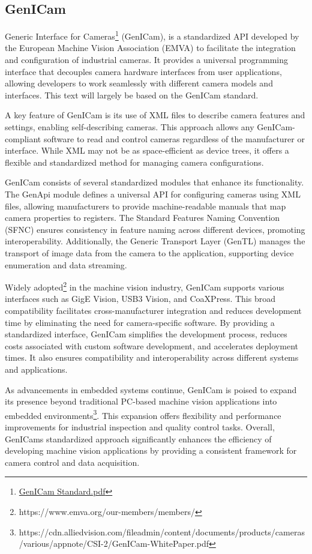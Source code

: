 \subsection {GenICam}
Generic Interface for Cameras\footnote{\href{https://www.emva.org/wp-content/uploads/GenICam\_Standard\_v2\_1\_1.pdf}{GenICam Standard.pdf}} (GenICam),
is a standardized API developed by the European Machine Vision Association
(EMVA) to facilitate the integration and configuration of industrial cameras.
It provides a universal programming interface that decouples camera hardware
interfaces from user applications, allowing developers to work seamlessly with
different camera models and interfaces. This text will largely be based on the
GenICam standard.

A key feature of GenICam is its use of XML files to describe camera features
and settings, enabling self-describing cameras. This approach allows any
GenICam-compliant software to read and control cameras regardless of the
manufacturer or interface. While XML may not be as space-efficient as device
trees, it offers a flexible and standardized method for managing camera
configurations.

GenICam consists of several standardized modules that enhance its
functionality. The GenApi module defines a universal API for configuring
cameras using XML files, allowing manufacturers to provide machine-readable
manuals that map camera properties to registers. The Standard Features Naming
Convention (SFNC) ensures consistency in feature naming across different
devices, promoting interoperability. Additionally, the Generic Transport Layer
(GenTL) manages the transport of image data from the camera to the application,
supporting device enumeration and data streaming.

Widely adopted\footnote{https://www.emva.org/our-members/members/} in the
machine vision industry, GenICam supports various interfaces such as GigE
Vision, USB3 Vision, and CoaXPress. This broad compatibility facilitates
cross-manufacturer integration and reduces development time by eliminating the
need for camera-specific software. By providing a standardized interface,
GenICam simplifies the development process, reduces costs associated with
custom software development, and accelerates deployment times. It also ensures
compatibility and interoperability across different systems and applications.

As advancements in embedded systems continue, GenICam is poised to expand its
presence beyond traditional PC-based machine vision applications into embedded
environments\footnote{https://cdn.alliedvision.com/fileadmin/content/documents/products/cameras/various/appnote/CSI-2/GenICam-WhitePaper.pdf}.
This expansion offers flexibility and performance improvements
for industrial inspection and quality control tasks. Overall, GenICams
standardized approach significantly enhances the efficiency of developing
machine vision applications by providing a consistent framework for camera
control and data acquisition.

